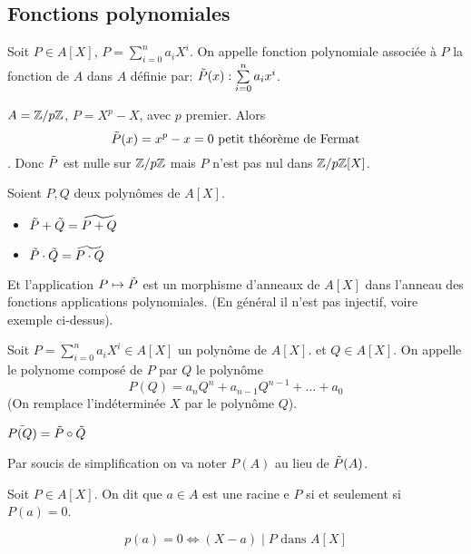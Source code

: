 \subsection{Fonctions polynomiales}

\begin{definition}
	Soit $P \in A[X]$, $P = \sum\limits_{i=0}^n a_iX^i$.
	On appelle fonction polynomiale associée à $P$ la fonction de $A$ dans $A$ définie par:
	$\tilde{P}(x): \sum\limits_{i=0}^n a_ix^i$.
\end{definition}

\begin{example}
	$A = \mathbb{Z}/p\mathbb{Z}$, $P = X^p - X$, avec $p$ premier.
	Alors $$\tilde{P}(x) = x^p - x = 0 \text{ petit théorème de Fermat}$$.
	Donc $\tilde{P}$ est nulle sur $\mathbb{Z}/p\mathbb{Z}$ mais $P$ n'est pas nul dans $\mathbb{Z}/p\mathbb{Z}[X]$.
\end{example}

\begin{prop}
	Soient $P,Q$ deux polynômes de $A[X]$.
	\begin{itemize}
		\item $\tilde{P} + \tilde{Q} = \widetilde{P+Q}$
		\item $\tilde{P} \cdot \tilde{Q} = \widetilde{P \cdot Q}$
	\end{itemize}
	Et l'application $P \mapsto \tilde{P}$ est un morphisme d'anneaux de $A[X]$ dans l'anneau des fonctions applications polynomiales.
	(En général il n'est pas injectif, voire exemple ci-dessus).
\end{prop}


\begin{definition}
	Soit $P = \sum\limits_{i=0}^n a_iX^i \in A[X]$ un polynôme de $A[X]$. et $Q \in A[X]$.
	On appelle le polynome composé de $P$ par $Q$ le polynôme $$P(Q) = a_nQ^n + a_{n-1}Q^{n-1} + \dots + a_0$$
	(On remplace l'indéterminée $X$ par le polynôme $Q$).
\end{definition}

\begin{prop}
	$\tilde{P(Q)} = \tilde{P} \circ \tilde{Q}$
\end{prop}

\noindent
Par soucis de simplification on va noter $P(A)$ au lieu de $\tilde{P}(A)$.

\begin{definition}
	Soit $P \in A[X]$. On dit que $a \in A$ est une racine e $P$ si et seulement si $P(a) = 0$.
\end{definition}

\begin{prop}
	$$ p(a) = 0 \iff (X-a) \mid P \text{ dans } A[X]$$
\end{prop}

